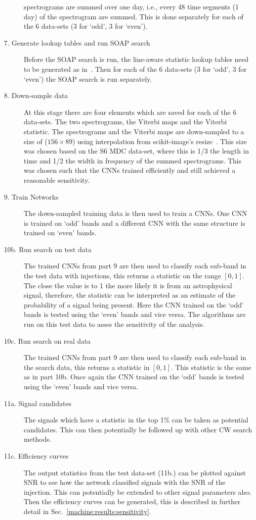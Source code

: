 \begin{description}
	spectrograms are summed over one day, i.e., every 48 time segments (1 day) of
	the spectrogram are summed. This is done separately for each of the 6 data-sets
	(3 for `odd', 3 for `even'). 
	\item[7. Generate lookup tables and run SOAP search] Before the SOAP search is
	run, the line-aware statistic lookup tables need to be generated as
	in~\cite{bayley2019SOAPGeneralised}. Then for each of the 6 data-sets (3 for
	`odd', 3 for `even') the SOAP search is run separately. 
	\item[8. Down-sample data] At this stage there are four elements which are
	saved for each of the 6 data-sets. The two spectrograms, the Viterbi maps and
	the Viterbi statistic. The spectrograms and the Viterbi maps are down-sampled
	to a size of ($156\times 89$) using interpolation from scikit-image's
	resize~\cite{vanderwalt2014ScikitimageImage}. This size was chosen based on the
	S6 \gls{MDC} data-set, where this is 1/3 the length in time and 1/2 the width in
	frequency of the summed spectrograms. 
	This was chosen such that the \glspl{CNN} trained efficiently and still achieved a reasonable sensitivity. 
	\item[9. Train Networks] The down-sampled training data is then used to train a
	\glspl{CNN}. One \gls{CNN} is trained on `odd' bands and a different \gls{CNN} with
	the same structure is trained on `even' bands. 
	\item[10b. Run search on test data] The trained \glspl{CNN} from part 9 are then
	used to classify each sub-band in the test data with injections, this returns a
	statistic on the range $[0,1]$. The close the value is to 1 the more likely it is from an astrophysical signal, therefore,  the statistic can be interpreted as an estimate of the probability of a signal being present. Here the \gls{CNN}
	trained on the `odd' bands is tested using the `even' bands and vice
	versa. The algorithms are run on this test data to asses the sensitivity of the analysis.
	\item[10c. Run search on real data] The trained \glspl{CNN} from part 9 are then
	used to classify each sub-band in the search data, this returns a statistic in
	$[0,1]$. This statistic is the same as in part 10b. 
	Once again the \gls{CNN} trained on the `odd' bands is tested using
	the `even' bands and vice versa.
	\item[11a. Signal candidates] The signals which have a statistic in the top
	1\% can be taken as potential candidates. 
	This can then potentially be followed up with other \gls{CW} search methods. 
	\item[11c. Efficiency curves] The output statistics from the test data-set (11b.) can
	be plotted against \gls{SNR} to see how the network classified signals with the
	\gls{SNR} of the injection. This can potentially be extended to other signal parameters also. 
	Then the efficiency curves can be generated, this is described in further detail in Sec.~\ref{machine:results:sensitivity}.
	

\end{description}
